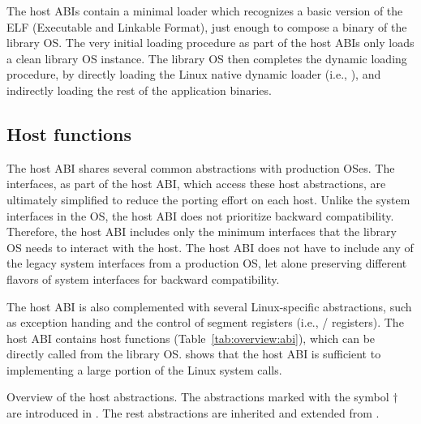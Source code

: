 The host ABIs contain a minimal loader which recognizes a basic version of the ELF (Executable and Linkable Format), just enough to compose a binary of the library OS.
The very initial loading procedure as part of the host ABIs only loads a clean library OS instance.
The library OS then completes the dynamic loading procedure,
by directly loading the Linux native dynamic loader (i.e., ), and indirectly loading the rest of the application binaries.





\subsection{Host functions}
\label{sec:overview:host:palcalls}


The host ABI shares several common abstractions with production OSes. The interfaces, as part of the host ABI, which access these host abstractions, are ultimately simplified to reduce the porting effort on each host.
Unlike the system interfaces in the OS, the host ABI does not prioritize backward compatibility. Therefore, the host ABI includes only the minimum interfaces that the library OS needs to interact with the host. The host ABI does not have to include any of  the legacy system interfaces from a production OS, let alone preserving different flavors of system interfaces for backward compatibility.




The host ABI is also complemented with several Linux-specific abstractions, such as exception handing and the control of segment registers (i.e., / registers).
The host ABI contains \palcalls{} host functions (Table~\ref{tab:overview:abi}), which can be directly called from the library OS. \graphene{} shows that the host ABI is sufficient to implementing a large portion of the Linux system calls.


\begin{table}[htp!]
\centering

\caption{Overview of the \graphene{} host abstractions. The abstractions marked with the symbol $\dagger$ are introduced in \graphene{}. The rest abstractions are inherited and extended from \drawbridge{}.}
\label{tab:overview:abi}
\end{table}


